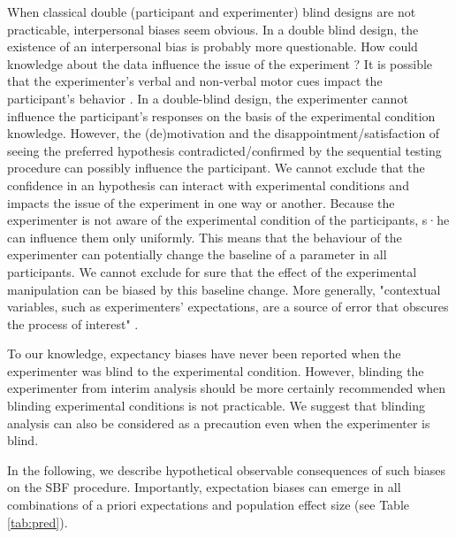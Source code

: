 \documentclass[a4paper,man,natbib,floatsintext,donotrepeattitle]{apa6}
\begin{document}
When classical double (participant and experimenter) blind designs are not practicable, interpersonal biases seem obvious. In a double blind design, the existence of an interpersonal bias is probably more questionable. How could knowledge about the data influence the issue of the experiment ? It is possible that the experimenter's verbal and non-verbal motor cues impact the participant's behavior \citep{zoble_interaction_1969}. In a double-blind design, the experimenter cannot influence the participant's responses on the basis of the experimental condition knowledge. However, the (de)motivation and the disappointment/satisfaction of seeing the preferred hypothesis contradicted/confirmed by the sequential testing procedure can possibly influence the participant. We cannot exclude that the confidence in an hypothesis can interact with experimental conditions and impacts the issue of the experiment in one way or another. Because the experimenter is not aware of the experimental condition of the participants, s·he can influence them only uniformly. This means that the behaviour of the experimenter can potentially change the baseline of a parameter in all participants. We cannot exclude for sure that the effect of the experimental manipulation can be biased by this baseline change. More generally, "contextual variables, such as experimenters’ expectations, are a source of error that obscures the process of interest" \citep{klein_low_2012}.\par

To our knowledge, expectancy biases have never been reported when the experimenter was blind to the experimental condition. However, blinding the experimenter from interim analysis should be more certainly recommended \citep{lakens_performing_2014} when blinding experimental conditions is not practicable. We suggest that blinding analysis can also be considered as a precaution even when the experimenter is blind.

In the following, we describe hypothetical observable consequences of such biases on the SBF procedure. Importantly, expectation biases can emerge in all combinations of a priori expectations and population effect size (see Table \ref{tab:pred}).

\end{document}
